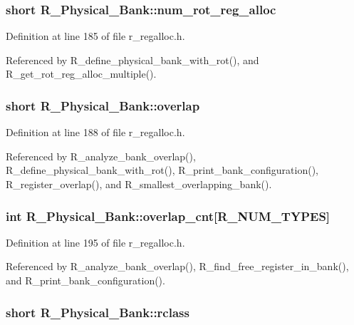 \subsubsection{\setlength{\rightskip}{0pt plus 5cm}short \bf{R\_\-Physical\_\-Bank::num\_\-rot\_\-reg\_\-alloc}}\label{structR__Physical__Bank_d5041421a11eced3af253ed438ee18ce}




Definition at line 185 of file r\_\-regalloc.h.

Referenced by R\_\-define\_\-physical\_\-bank\_\-with\_\-rot(), and R\_\-get\_\-rot\_\-reg\_\-alloc\_\-multiple().
\subsubsection{\setlength{\rightskip}{0pt plus 5cm}short \bf{R\_\-Physical\_\-Bank::overlap}}\label{structR__Physical__Bank_86f7a4fc394d347f974cc02e86d7616d}




Definition at line 188 of file r\_\-regalloc.h.

Referenced by R\_\-analyze\_\-bank\_\-overlap(), R\_\-define\_\-physical\_\-bank\_\-with\_\-rot(), R\_\-print\_\-bank\_\-configuration(), R\_\-register\_\-overlap(), and R\_\-smallest\_\-overlapping\_\-bank().
\subsubsection{\setlength{\rightskip}{0pt plus 5cm}int \bf{R\_\-Physical\_\-Bank::overlap\_\-cnt}[R\_\-NUM\_\-TYPES]}\label{structR__Physical__Bank_fb6da27fd0c9bf2cf483898592ba6095}




Definition at line 195 of file r\_\-regalloc.h.

Referenced by R\_\-analyze\_\-bank\_\-overlap(), R\_\-find\_\-free\_\-register\_\-in\_\-bank(), and R\_\-print\_\-bank\_\-configuration().
\subsubsection{\setlength{\rightskip}{0pt plus 5cm}short \bf{R\_\-Physical\_\-Bank::rclass}}\label{structR__Physical__Bank_b6b3ef66fb73b3de73780049a8f8d01f}




